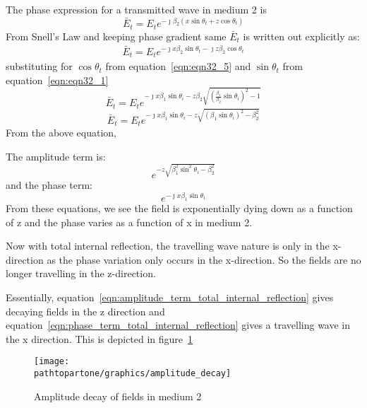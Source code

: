\begin{enumerate}[(i)]
The phase expression for a transmitted wave in medium 2 is
\begin{equation*}
\bar{E}_t = E_{t}e^{-\jmath \beta_2(x\sin\theta_t + z\cos\theta_t)}
\end{equation*}
From Snell's Law and keeping phase gradient same $\bar{E}_t$ is written out explicitly as:
\begin{align}
\bar{E}_t = E_te^{- \jmath x\beta_2\sin\theta_t - \jmath z\beta_2\cos\theta_t}
\end{align}
substituting for $\cos\theta_t$ from equation~\ref{eqn:eqn32_5}
and $\sin\theta_t$ from equation~\ref{eqn:eqn32_1}
\begin{equation*}
\bar{E}_t = E_te^{- {\jmath x\beta_1\sin\theta_i}  -  z \beta_2\sqrt{{(\frac{\beta_1}{\beta_2}\sin\theta_i)}^2 - 1}}
\end{equation*}
\begin{equation}
\bar{E}_t = E_te^{- {\jmath x\beta_1\sin\theta_i}  -  z \sqrt{{(\beta_1\sin\theta_i)}^2 - \beta_{2}^{2}}}
\end{equation}
From the above equation,

The amplitude term is:
\begin{equation}
e^{-z\sqrt{\beta_1^2\sin^2\theta_i - \beta_2^{2}}}
\label{eqn:amplitude_term_total_internal_reflection}
\end{equation}
and the phase term:
\begin{equation}
e^{- \jmath x\beta_1\sin\theta_i}
\label{eqn:phase_term_total_internal_reflection}
\end{equation}
From these equations, we see the field is exponentially dying down as a function of z and the phase varies as a function of x in medium 2.
\end{enumerate}
Now with total internal reflection, the travelling wave nature is only in the x-direction as the phase variation only occurs in the x-direction. So the fields are no longer travelling in the z-direction.

Essentially, equation~\ref{eqn:amplitude_term_total_internal_reflection} gives decaying fields in the z direction and equation~\ref{eqn:phase_term_total_internal_reflection}  gives a travelling wave in the x direction. This is depicted in figure~\ref{fig:amplitude_decay_total_internal_reflection}
\begin{figure}[h]
\centering
\texttt{[image: \\pathtopartone/graphics/amplitude\_decay]}
\caption{Amplitude decay of fields in medium 2}
\label{fig:amplitude_decay_total_internal_reflection}
\end{figure}

